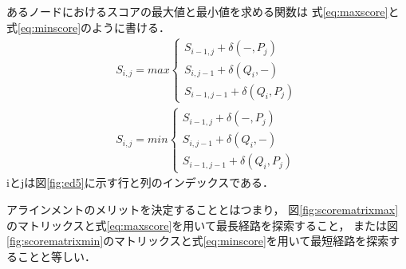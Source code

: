 あるノードにおけるスコアの最大値と最小値を求める関数は
式\ref{eq:maxscore}と式\ref{eq:minscore}のように書ける．
\begin{subequations}
\begin{align}
S_{i,j}= max \left \{
\begin{array}{l}
S_{i-1,j}+\delta(-,P_{j}) \\
S_{i,j-1}+\delta(Q_{i},-) \\
S_{i-1,j-1}+\delta(Q_{i},P_{j})
\end{array}
\right.\label{eq:maxscore} \\
S_{i,j}= min \left \{
\begin{array}{l}
S_{i-1,j}+\delta(-,P_{j}) \\
S_{i,j-1}+\delta(Q_{i},-) \\
S_{i-1,j-1}+\delta(Q_{i},P_{j})
\end{array}
\right.\label{eq:minscore}
\end{align}
\label{eq:minmaxscore}
\end{subequations}
iとjは図\ref{fig:ed5}に示す行と列のインデックスである．

アラインメントのメリットを決定することとはつまり，
図\ref{fig:scorematrixmax}のマトリックスと式\ref{eq:maxscore}を用いて最長経路を探索すること，
または図\ref{fig:scorematrixmin}のマトリックスと式\ref{eq:minscore}を用いて最短経路を探索することと等しい．

